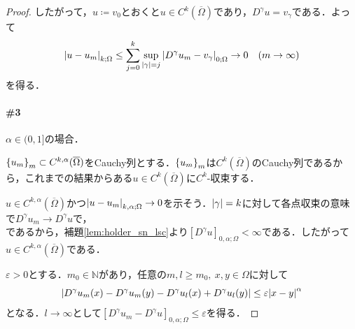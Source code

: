 \documentclass[a4paper]{ltjsarticle}
\newcommand{\Nset}{\mathbb{N}}
\newcommand{\Om}{\Omega}
\newcommand{\Ombar}{\overline{\Omega}}
\newcommand{\1}{\mathbbm{1}}
\numberwithin{equation}{section}
\theoremstyle{definition}
\begin{document}
\begin{proof}
    したがって，$u\coloneqq v_0$とおくと$u\in C^k(\Ombar)$であり，$D^\gamma u=v_\gamma$である．よって
    \begin{equation}
        \abs{u-u_m}_{k;\Om}\leq \sum_{j=0}^k\sup_{\abs{\gamma}=j}\abs{D^\gamma u_m-v_\gamma}_{0;\Om}\to0\quad (m\to\infty)
    \end{equation}
    を得る．

    \paragraph*{\#3}$\alpha\in (0,1]$の場合．

    $\qty{u_m}_m\subset C^{k,\alpha}(\Ombar)$をCauchy列とする．$\qty{u_m}_m$は$C^k(\Ombar)$のCauchy列であるから，これまでの結果からある$u\in C^k(\Ombar)$に$C^k$-収束する．

    $u\in C^{k,\alpha}(\Ombar)$かつ$\abs{u-u_m}_{k,\alpha;\Om}\to0$を示そう．$\abs{\gamma}=k$に対して各点収束の意味で$D^\gamma u_m\to D^\gamma u$で，
    \begin{equation}
    \end{equation}
    であるから，補題\ref{lem:holder_sn_lsc}より$[D^\gamma u]_{0,\alpha;\Om}<\infty$である．したがって$u\in C^{k,\alpha}(\Ombar)$である．

    $\varepsilon>0$とする．$m_0\in\Nset$があり，任意の$m,l\geq m_0,\ x,y\in\Om$に対して
    \begin{equation}
        \abs{D^\gamma u_m(x)-D^\gamma u_m(y)-D^\gamma u_l(x)+D^\gamma u_l(y)}\leq \varepsilon\abs{x-y}^\alpha 
    \end{equation}
    となる．$l\to\infty$として$[D^\gamma u_m-D^\gamma u]_{0,\alpha;\Om}\leq \varepsilon$を得る．
\end{proof}
\end{document}

